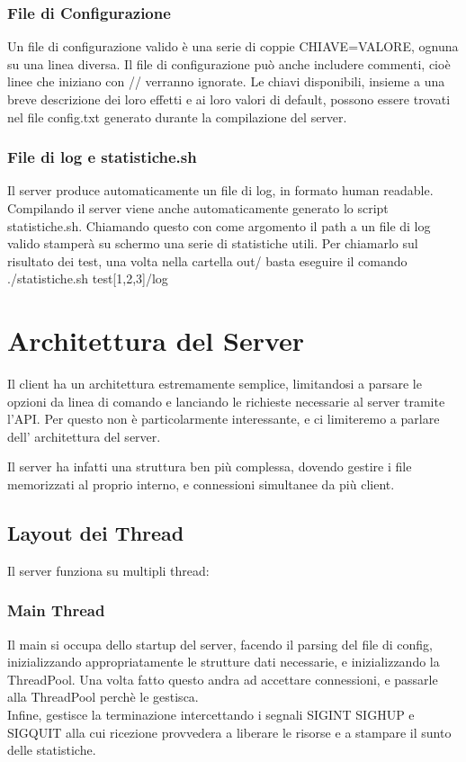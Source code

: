 \documentclass[11pt]{article}
\begin{document}
\begin{flushleft}
\subsubsection{File di Configurazione}

Un file di configurazione valido è una serie di coppie CHIAVE=VALORE, ognuna su una linea diversa.
Il file di configurazione può anche includere commenti, cioè linee che iniziano con // verranno ignorate. Le chiavi disponibili, insieme a una breve descrizione dei loro effetti e ai loro valori di default, possono essere trovati nel file config.txt generato durante la compilazione del server.

\subsubsection{File di log e statistiche.sh}

Il server produce automaticamente un file di log, in formato human readable.
Compilando il server viene anche automaticamente generato lo script statistiche.sh. Chiamando questo con come argomento il path a un file di log valido stamperà su schermo una serie di statistiche utili.
Per chiamarlo sul risultato dei test, una volta nella cartella out/ basta eseguire il comando ./statistiche.sh test[1,2,3]/log

\section{Architettura del Server}

Il client ha un architettura estremamente semplice, limitandosi a parsare le opzioni da linea di comando e lanciando le richieste necessarie al server tramite l'API. Per questo non è particolarmente interessante, e ci limiteremo a parlare dell' architettura del server.

Il server ha infatti una struttura ben più complessa, dovendo gestire i file memorizzati al proprio interno, e connessioni simultanee da più client. 

\subsection{Layout dei Thread}
Il server funziona su multipli thread:

\subsubsection{Main Thread}
Il main si occupa dello startup del server, facendo il parsing del file di config, inizializzando appropriatamente le strutture dati necessarie, e inizializzando la ThreadPool. Una volta fatto questo andra ad accettare connessioni, e passarle alla ThreadPool perchè le gestisca.
\\Infine, gestisce la terminazione intercettando i segnali SIGINT SIGHUP e SIGQUIT alla cui ricezione provvedera a liberare le risorse e a stampare il sunto delle statistiche.


\end{flushleft}
\end{document}
